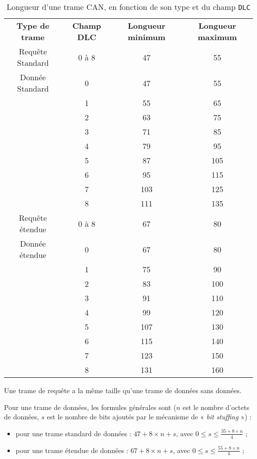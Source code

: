 \begin{table}[!t]
  \small
  \centering
  \begin{tabular}{cccc}
    \textbf{Type de trame}& \textbf{Champ DLC} & \textbf{Longueur minimum} & \textbf{Longueur maximum} \\
    Requête Standard & 0 à 8 & 47 & 55 \\
    Donnée Standard & 0 & 47 & 55 \\
             & 1 & 55 & 65 \\
             & 2 & 63 & 75 \\
             & 3 & 71 & 85 \\
             & 4 & 79 & 95 \\
             & 5 & 87 & 105 \\
             & 6 & 95 & 115 \\
             & 7 & 103 & 125 \\
             & 8 & 111 & 135 \\
    Requête étendue  & 0 à 8 & 67 & 80 \\
    Donnée étendue  & 0 & 67 & 80 \\
             & 1 & 75 & 90 \\
             & 2 & 83 & 100 \\
             & 3 & 91 & 110 \\
             & 4 & 99 & 120 \\
             & 5 & 107 & 130 \\
             & 6 & 115 & 140 \\
             & 7 & 123 & 150 \\
             & 8 & 131 & 160 \\
   \end{tabular}
  \caption{Longueur d'une trame CAN, en fonction de son type et du champ \texttt{DLC}}
  \ligne
\end{table}

Une trame de requête a la même taille qu'une trame de données sans données.

Pour une trame de données, les formules générales sont ($n$ est le nombre d'octets de données, $s$ est le nombre de bits ajoutés par le mécanisme de « \emph{bit stuffing} ») :
\begin{itemize}
  \item pour une trame standard de données : $47 + 8 \times n + s$, avec $0 \leqslant s \leqslant \displaystyle\frac{35 + 8 \times n}{4}$ ;
  \item pour une trame étendue de données : $67 + 8 \times n + s$, avec $0 \leqslant s \leqslant \displaystyle\frac{55 + 8 \times n}{4}$ ;
\end{itemize}

